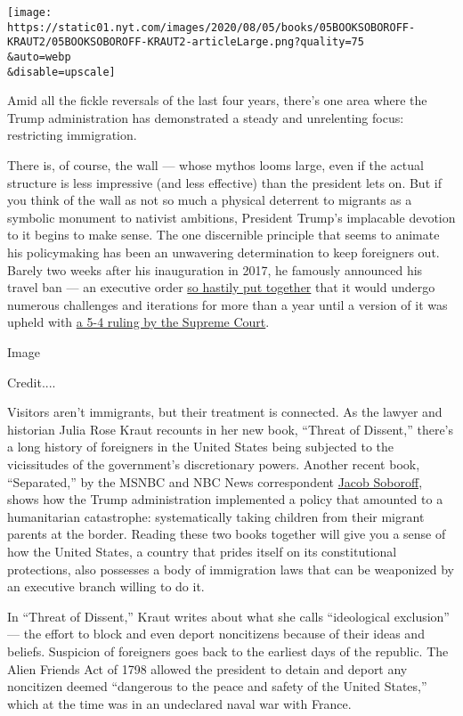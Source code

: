 \texttt{[image: https://static01.nyt.com/images/2020/08/05/books/05BOOKSOBOROFF-KRAUT2/05BOOKSOBOROFF-KRAUT2-articleLarge.png?quality=75\\\&auto=webp\\\&disable=upscale]}

Amid all the fickle reversals of the last four years, there's one area
where the Trump administration has demonstrated a steady and unrelenting
focus: restricting immigration.

There is, of course, the wall --- whose mythos looms large, even if the
actual structure is less impressive (and less effective) than the
president lets on. But if you think of the wall as not so much a
physical deterrent to migrants as a symbolic monument to nativist
ambitions, President Trump's implacable devotion to it begins to make
sense. The one discernible principle that seems to animate his
policymaking has been an unwavering determination to keep foreigners
out. Barely two weeks after his inauguration in 2017, he famously
announced his travel ban --- an executive order
\href{https://www.nytimes.com/2017/02/05/us/politics/donald-trump-mike-pence-travel-ban-judge.html}{so
hastily put together} that it would undergo numerous challenges and
iterations for more than a year until a version of it was upheld with
\href{https://www.nytimes.com/2018/06/26/us/politics/supreme-court-trump-travel-ban.html}{a
5-4 ruling by the Supreme Court}.

Image

Credit....

Visitors aren't immigrants, but their treatment is connected. As the
lawyer and historian Julia Rose Kraut recounts in her new book, ``Threat
of Dissent,'' there's a long history of foreigners in the United States
being subjected to the vicissitudes of the government's discretionary
powers. Another recent book, ``Separated,'' by the MSNBC and NBC News
correspondent
\href{https://www.nytimes.com/2020/07/23/books/review/separated-jacob-soboroff.html}{Jacob
Soboroff}, shows how the Trump administration implemented a policy that
amounted to a humanitarian catastrophe: systematically taking children
from their migrant parents at the border. Reading these two books
together will give you a sense of how the United States, a country that
prides itself on its constitutional protections, also possesses a body
of immigration laws that can be weaponized by an executive branch
willing to do it.

In ``Threat of Dissent,'' Kraut writes about what she calls
``ideological exclusion'' --- the effort to block and even deport
noncitizens because of their ideas and beliefs. Suspicion of foreigners
goes back to the earliest days of the republic. The Alien Friends Act of
1798 allowed the president to detain and deport any noncitizen deemed
``dangerous to the peace and safety of the United States,'' which at the
time was in an undeclared naval war with France.

